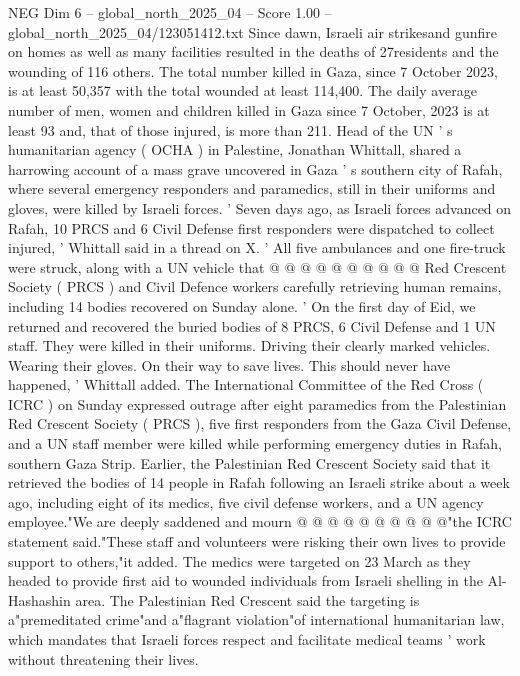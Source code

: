 \begin{textsample}{NEG Dim 6 – global\_north\_2025\_04 – Score 1.00 – global\_north\_2025\_04/123051412.txt}  \label{ex:f6_neg_238}
Since dawn, Israeli air strikesand gunfire on homes as well as many facilities resulted in the deaths of 27residents and the wounding of 116 others.
The total number killed in Gaza, since 7 October 2023, is at least 50,357 with the total wounded at least 114,400.
The daily average number of men, women and children killed in Gaza since 7 October, 2023 is at least 93 and, that of those injured, is more than 211.
Head of the UN ' s humanitarian agency ( OCHA ) in Palestine, Jonathan Whittall, shared a harrowing account of a mass grave uncovered in Gaza ' s southern city of Rafah, where several emergency responders and paramedics, still in their uniforms and gloves, were killed by Israeli forces. ' Seven days ago, as Israeli forces advanced on Rafah, 10 PRCS and 6 Civil Defense first responders were dispatched to collect injured, ' Whittall said in a thread on X. ' All five ambulances and one fire-truck were struck, along with a UN vehicle that @ @ @ @ @ @ @ @ @ @ Red Crescent Society ( PRCS ) and Civil Defence workers carefully retrieving human remains, including 14 bodies recovered on Sunday alone. ' On the first day of Eid, we returned and recovered the buried bodies of 8 PRCS, 6 Civil Defense and 1 UN staff.
They were killed in their uniforms.
Driving their clearly marked vehicles.
Wearing their gloves.
On their way to save lives.
This should never have happened, ' Whittall added.
The International Committee of the Red Cross ( ICRC ) on Sunday expressed outrage after eight paramedics from the Palestinian Red Crescent Society ( PRCS ), five first responders from the Gaza Civil Defense, and a UN staff member were killed while performing emergency duties in Rafah, southern Gaza Strip.
Earlier, the Palestinian Red Crescent Society said that it retrieved the bodies of 14 people in Rafah following an Israeli strike about a week ago, including eight of its medics, five civil defense workers, and a UN agency employee."We are deeply saddened and mourn @ @ @ @ @ @ @ @ @ @"the ICRC statement said."These staff and volunteers were risking their own lives to provide support to others,"it added.
The medics were targeted on 23 March as they headed to provide first aid to wounded individuals from Israeli shelling in the Al-Hashashin area.
The Palestinian Red Crescent said the targeting is a"premeditated crime"and a"flagrant violation"of international humanitarian law, which mandates that Israeli forces respect and facilitate medical teams ' work without threatening their lives.

\end{textsample}
